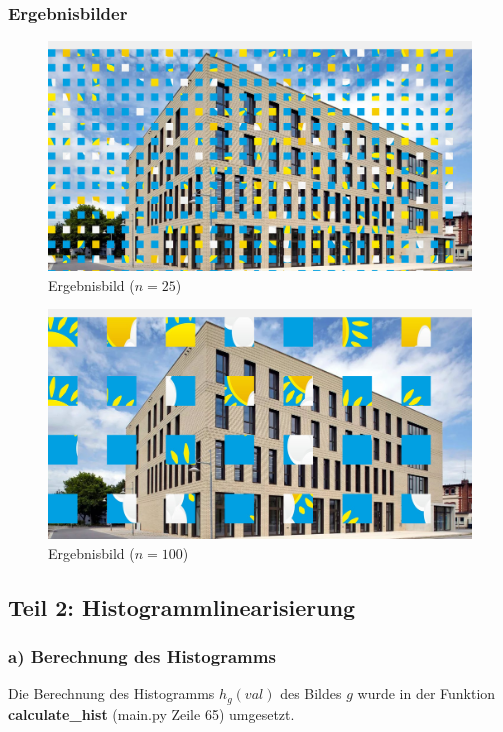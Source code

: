 \documentclass[12pt]{article}
\begin{document}
\subsubsection*{Ergebnisbilder}
\begin{figure}[h]
  \centering
  \begin{minipage}{0.49\textwidth}
    \centering
    \includegraphics[width=\textwidth]{kachel_25.png}
    Ergebnisbild ($n = 25$)
  \end{minipage}
  \hfill
  \begin{minipage}{0.49\textwidth}
    \centering
    \includegraphics[width=\textwidth]{kachel_100.png}
    Ergebnisbild ($n = 100$)
  \end{minipage}
\end{figure}

\newpage

\subsection*{Teil 2: Histogrammlinearisierung}
\subsubsection*{a) Berechnung des Histogramms}
Die Berechnung des Histogramms $h_g(val)$ des Bildes $g$ wurde in der Funktion \textbf{calculate\_hist} (main.py Zeile 65) umgesetzt.
\end{document}
